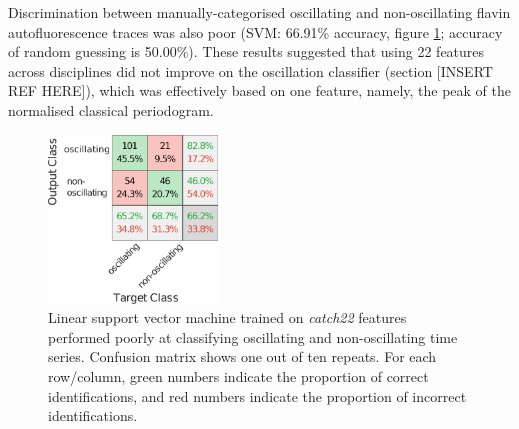 Discrimination between manually-categorised oscillating and non-oscillating flavin autofluorescence traces was also poor (SVM: 66.91\% accuracy, figure \ref{fig:OscillatingCM}; accuracy of random guessing is 50.00\%). %
These results suggested that using 22 %
features across disciplines did not improve on the oscillation classifier (section [INSERT REF HERE]), which was effectively based on one feature, namely, the peak of the normalised classical periodogram.

\begin{figure}[htbp]
  \centering
  \includegraphics[width=0.4\textwidth]{10m_OscillatingCM}
  \caption{Linear support vector machine trained on \emph{catch22} features performed poorly at classifying oscillating and non-oscillating time series.
    Confusion matrix shows one out of ten repeats.
    For each row/column, green numbers indicate the proportion of correct identifications, and red numbers indicate the proportion of incorrect identifications.}
  \label{fig:OscillatingCM}
\end{figure}
